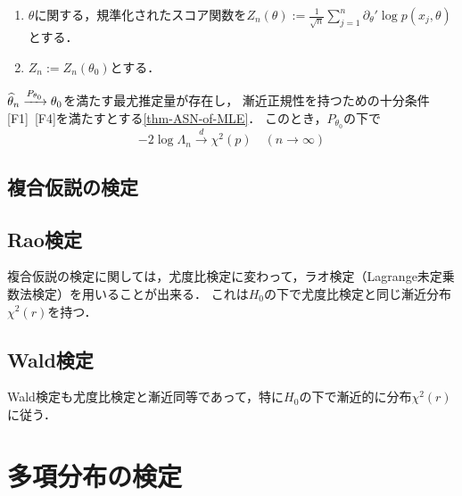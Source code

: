 \documentclass[uplatex,dvipdfmx]{jsreport}
\begin{document}
\begin{definition}\mbox{}
    \begin{enumerate}
        \item $\theta$に関する，規準化されたスコア関数を$Z_n(\theta):=\frac{1}{\sqrt{n}}\sum^n_{j=1}\partial_\theta'\log p(x_j,\theta)$とする．
        \item $Z_n:=Z_n(\theta_0)$とする．
    \end{enumerate}
\end{definition}

\begin{theorem}
    $\widehat{\theta}_n\xrightarrow{P_{\theta_0}}\theta_0$を満たす最尤推定量が存在し，
    漸近正規性を持つための十分条件[F1]~[F4]を満たすとする\ref{thm-ASN-of-MLE}．
    このとき，$P_{\theta_0}$の下で
    \[-2\log\Lambda_n\xrightarrow{d}\chi^2(p)\quad(n\to\infty)\]
\end{theorem}

\subsection{複合仮説の検定}

\subsection{Rao検定}

\begin{tcolorbox}[colframe=ForestGreen, colback=ForestGreen!10!white,breakable,colbacktitle=ForestGreen!40!white,coltitle=black,fonttitle=\bfseries\sffamily,
title=]
    複合仮説の検定に関しては，尤度比検定に変わって，ラオ検定（Lagrange未定乗数法検定）を用いることが出来る．
    これは$H_0$の下で尤度比検定と同じ漸近分布$\chi^2(r)$を持つ．
\end{tcolorbox}

\subsection{Wald検定}

\begin{tcolorbox}[colframe=ForestGreen, colback=ForestGreen!10!white,breakable,colbacktitle=ForestGreen!40!white,coltitle=black,fonttitle=\bfseries\sffamily,
title=]
    Wald検定も尤度比検定と漸近同等であって，特に$H_0$の下で漸近的に分布$\chi^2(r)$に従う．
\end{tcolorbox}

\section{多項分布の検定}
\end{document}
